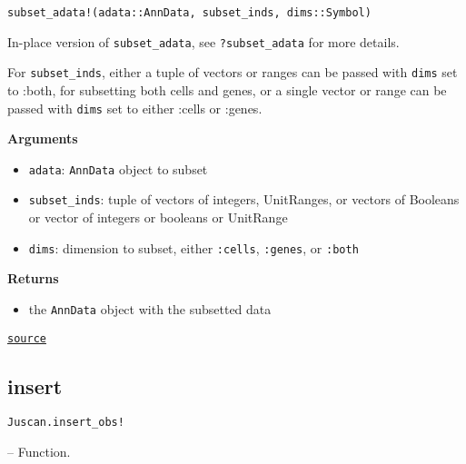 \documentclass[oneside]{memoir}
\begin{document}
\begin{adjustwidth}{2em}{0pt}


\begin{verbatim}
subset_adata!(adata::AnnData, subset_inds, dims::Symbol)
\end{verbatim}

In-place version of \texttt{subset\_adata}, see \texttt{?subset\_adata} for more details. 

For \texttt{subset\_inds}, either a tuple of vectors or ranges can be passed with \texttt{dims} set to :both, for subsetting  both cells and genes, or a single vector or range can be passed with \texttt{dims} set to either :cells or :genes.

\textbf{Arguments}

\begin{itemize}
\item \texttt{adata}: \texttt{AnnData} object to subset


\item \texttt{subset\_inds}: tuple of vectors of integers, UnitRanges, or vectors of Booleans or vector of integers or booleans or UnitRange


\item \texttt{dims}: dimension to subset, either \texttt{:cells}, \texttt{:genes}, or \texttt{:both}

\end{itemize}
\textbf{Returns}

\begin{itemize}
\item the \texttt{AnnData} object with the subsetted data

\end{itemize}


\href{https://github.com/zehua0417/Juscan.jl/blob/393ad1b827b678ea98a738f92af658ee9ed9a403/src/anndata.jl#L239-L254}{\texttt{source}}


\end{adjustwidth}

\subsection{insert}



\label{5057365744536548781}{}

\hypertarget{824771256157212624}{\texttt{Juscan.insert\_obs!}}  -- {Function.}
\end{document}
